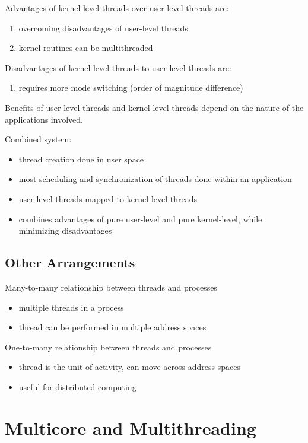 \documentclass[11pt]{article}
\begin{document}
Advantages of kernel-level threads over
user-level threads are:
\begin{enumerate}
\item overcoming disadvantages of user-level threads
\item kernel routines can be multithreaded
\end{enumerate}

Disadvantages of kernel-level threads to
user-level threads are:
\begin{enumerate}
\item requires more mode switching (order of magnitude difference)
\end{enumerate}

Benefits of user-level threads and kernel-level threads
depend on the nature of the applications involved.

Combined system:
\begin{itemize}
\item thread creation done in user space
\item most scheduling and synchronization of threads done
within an application
\item user-level threads mapped to kernel-level threads
\item combines advantages of pure user-level and pure
kernel-level, while minimizing disadvantages
\end{itemize}
\subsection{Other Arrangements}
\label{sec:org7d2428b}
Many-to-many relationship between threads and processes
\begin{itemize}
\item multiple threads in a process
\item thread can be performed in multiple address spaces
\end{itemize}

One-to-many relationship between threads and processes
\begin{itemize}
\item thread is the unit of activity, can move across address spaces
\item useful for distributed computing
\end{itemize}
\section{Multicore and Multithreading}
\label{sec:orgd533b2f}
\end{document}
